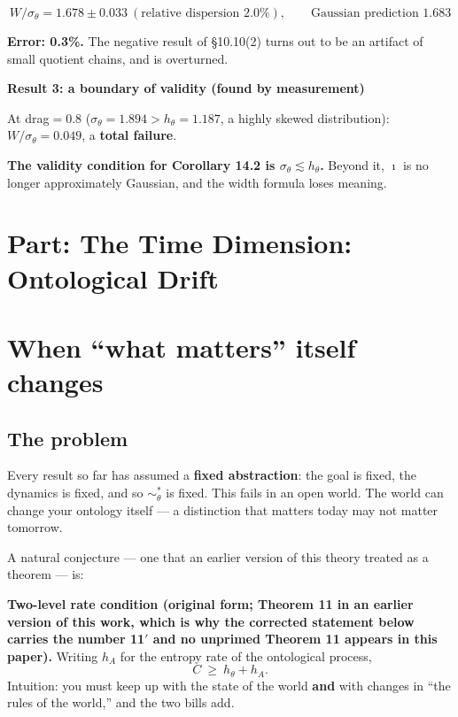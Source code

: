 \documentclass[11pt]{article}
\renewenvironment{quote}
  {\def\FrameCommand{{\color{gray!60}\vrule width 2pt}\hspace{8pt}}%
   \MakeFramed{\advance\hsize-\width \FrameRestore}\begin{itshape}}
  {\end{itshape}\endMakeFramed}
\begin{document}
\[W/\sigma_\theta=1.678\pm0.033\ (\text{relative dispersion }2.0\%),\qquad\text{Gaussian prediction }1.683\]

\textbf{Error: 0.3\%.} The negative result of \S{}10.10(2) turns out to be an artifact of small quotient chains, and is overturned.

\textbf{Result 3: a boundary of validity (found by measurement)}

At drag\(=0.8\) (\(\sigma_\theta=1.894>h_\theta=1.187\), a highly skewed distribution): \(W/\sigma_\theta=\mathbf{0.049}\), a \textbf{total failure}.

\begin{quote}
\textbf{The validity condition for Corollary 14.2 is \(\sigma_\theta\lesssim h_\theta\).} Beyond it, \(\imath\) is no longer approximately Gaussian, and the width formula loses meaning.
\end{quote}

\hypertarget{part-the-time-dimension-ontological-drift}{%
\section*{Part: The Time Dimension: Ontological Drift}\label{part-the-time-dimension-ontological-drift}}

\hypertarget{when-what-matters-itself-changes}{%
\section{When ``what matters'' itself changes}\label{when-what-matters-itself-changes}}

\hypertarget{the-problem}{%
\subsection{The problem}\label{the-problem}}

Every result so far has assumed a \textbf{fixed abstraction}: the goal is fixed, the dynamics is fixed, and so \(\sim_\theta^*\) is fixed. This fails in an open world. The world can change your ontology itself --- a distinction that matters today may not matter tomorrow.

A natural conjecture --- one that an earlier version of this theory treated as a theorem --- is:

\begin{quote}
\textbf{Two-level rate condition (original form; Theorem 11 in an earlier version of this work, which is why the corrected statement below carries the number 11\('\) and no unprimed Theorem 11 appears in this paper).} Writing \(h_A\) for the entropy rate of the ontological process,
\[C\ \ge\ h_\theta+h_A.\]
Intuition: you must keep up with the state of the world \textbf{and} with changes in ``the rules of the world,'' and the two bills add.
\end{quote}
\end{document}

